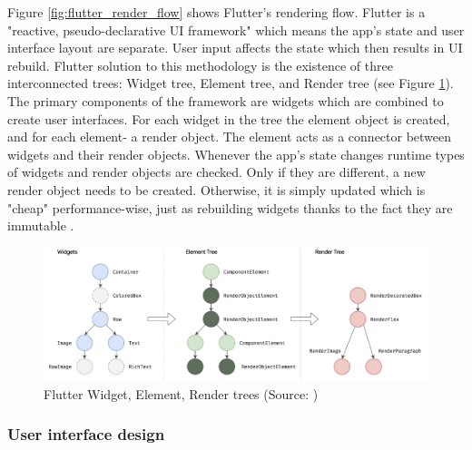 Figure \ref{fig:flutter_render_flow} shows Flutter's rendering flow. Flutter is a "reactive, pseudo-declarative UI framework" which means the app's state and user interface layout are separate. User input affects the state which then results in UI rebuild. Flutter solution to this methodology is the existence of three interconnected trees: Widget tree, Element tree, and Render tree (see Figure \ref{fig:flutter_trees}). The primary components of the framework are widgets which are combined to create user interfaces. For each widget in the tree the element object is created, and for each element- a render object. The element acts as a connector between widgets and their render objects. Whenever the app's state changes runtime types of widgets and render objects are checked. Only if they are different, a new render object needs to be created. Otherwise, it is simply updated which is "cheap" performance-wise, just as rebuilding widgets thanks to the fact they are immutable \cite{flutter_docs_architecture}.

\begin{figure}[h]
	\centering
	\includegraphics[width=\textwidth]{img/flutter_trees}
	\caption{Flutter Widget, Element, Render trees (Source: \cite{flutter_docs_architecture})}
	\label{fig:flutter_trees}
\end{figure}



\subsubsection*{User interface design}

